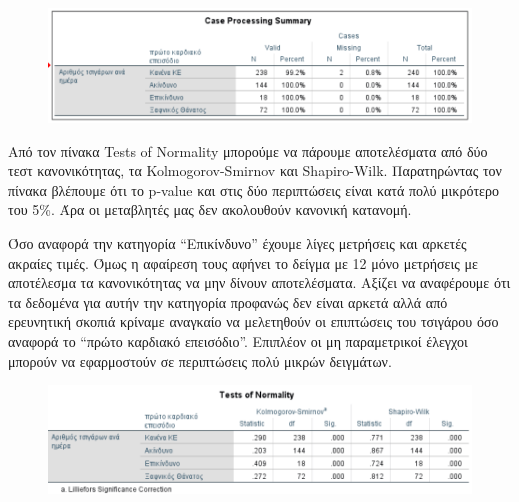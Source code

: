 \begin{figure}[h]
    \centering
    \includegraphics[width=\textwidth]{images/200.PNG}
\end{figure}

\vspace{1cm}
Από τον πίνακα Tests of Normality μπορούμε να πάρουμε αποτελέσματα από δύο τεστ κανονικότητας, τα Kolmogorov-Smirnov και Shapiro-Wilk. Παρατηρώντας τον πίνακα βλέπουμε ότι το p-value και στις δύο περιπτώσεις είναι κατά πολύ μικρότερο του 5\%.  Άρα οι μεταβλητές μας δεν ακολουθούν κανονική κατανομή.

Όσο αναφορά την κατηγορία “Επικίνδυνο” έχουμε λίγες μετρήσεις και αρκετές ακραίες τιμές. Όμως η αφαίρεση τους αφήνει το δείγμα με 12 μόνο μετρήσεις με αποτέλεσμα τα  κανονικότητας να μην δίνουν αποτελέσματα. Αξίζει να αναφέρουμε ότι τα δεδομένα για αυτήν την κατηγορία προφανώς δεν είναι αρκετά αλλά από ερευνητική σκοπιά κρίναμε αναγκαίο να μελετηθούν οι επιπτώσεις του τσιγάρου όσο αναφορά το “πρώτο καρδιακό επεισόδιο”. Επιπλέον οι μη παραμετρικοί έλεγχοι  μπορούν να εφαρμοστούν σε περιπτώσεις πολύ μικρών δειγμάτων.

\clearpage

\begin{figure}[h]
    \centering
    \includegraphics[width=\textwidth]{images/201.PNG}
\end{figure}

\vspace{1cm}

